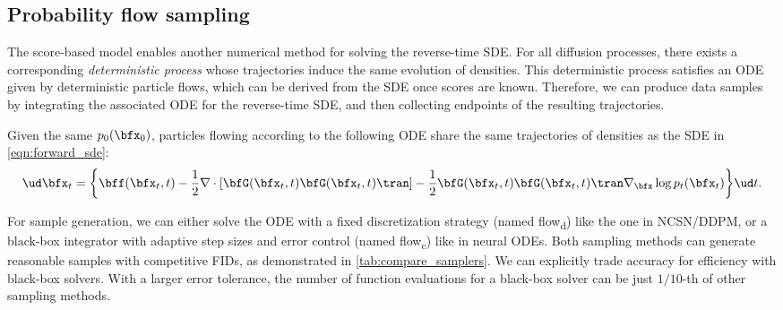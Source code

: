 \subsection{Probability flow sampling}
The score-based model enables another numerical method for solving the reverse-time SDE. %
For all diffusion processes, there exists a corresponding \emph{deterministic process} whose trajectories induce the same evolution of densities. This deterministic process satisfies an ODE given by deterministic particle flows, which can be derived from the SDE once scores are known. Therefore, we can produce data samples by integrating the associated ODE for the reverse-time SDE, and then collecting endpoints of the resulting trajectories. 

\begin{theorem}
Given the same $p_0(\bfx_0)$, particles flowing according to the following ODE share the same trajectories of densities as the SDE in \cref{eqn:forward_sde}:
\begin{align}
    \ud \bfx_t = \bigg\{\bff(\bfx_t, t) - \frac{1}{2} \nabla \cdot [\bfG(\bfx_t, t)\bfG(\bfx_t, t)\tran] - \frac{1}{2} \bfG(\bfx_t, t)\bfG(\bfx_t, t)\tran \nabla_\bfx \log p_t(\bfx_t)\bigg\} \ud t \label{eqn:flow}.
\end{align}
\end{theorem}

For sample generation, we can either solve the ODE with a fixed discretization strategy (named flow\textsubscript{d}) like the one in NCSN/DDPM, or a black-box integrator with adaptive step sizes and error control (named flow\textsubscript{c}) like in neural ODEs. Both sampling methods can generate reasonable samples with competitive FIDs, as demonstrated in \cref{tab:compare_samplers}. We can explicitly trade accuracy for efficiency with black-box solvers. With a larger error tolerance, the number of function evaluations for a black-box solver can be just $1/10$-th of other sampling methods. 

